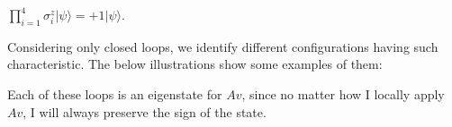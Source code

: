 \documentclass[12pt]{report}
\begin{document}
\begin{minipage}{1\textwidth}
	\begin{center}
		$\prod_{i=1}^{4} \sigma_{i}^{z} |\psi\rangle = +1 |\psi\rangle$. \newline
	\end{center}
	
	Considering only closed loops, we identify different configurations having such characteristic. The below illustrations show some examples of them:\newline
	
	
	Each of these loops is an eigenstate for $Av$, since no matter how I locally apply $Av$, I will always preserve the sign of the state. \newline
	
	
	
	
\end{minipage}
\end{document}

